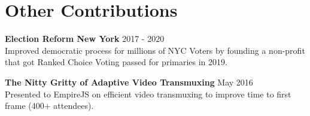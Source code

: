 \section{Other Contributions}

    \textbf{Election Reform New York} \hfill 2017 - 2020\\
    Improved democratic process for millions of NYC Voters by founding a non-profit that got Ranked Choice Voting passed for primaries in 2019. 
    \vspace{10pt}    

        
    \textbf{The Nitty Gritty of Adaptive Video Transmuxing} \hfill May  2016\\
    Presented to EmpireJS on efficient video transmuxing to improve time to first frame (400+ attendees).

  \begin{comment}  
    \begin{itemize}
    \item CIO of Beach Recovery Foundation, non-profit working to reverse human effect on beach erosion
    \item CTO of Simplify Reality, distills current events into 400 word summaries for millennials
    \item Security research for kingsofchaos.com, successfully identified and mitigated a slowloris DDoS attack in real time
    \item Consultant for AI-Coin, a bitcoin variant which trades-off decentralization for sub-second transactions
    \item Member of think-tank for MiMedia, a Brooklyn based startup for cloud storage of media
    \end{itemize}
  \end{comment}